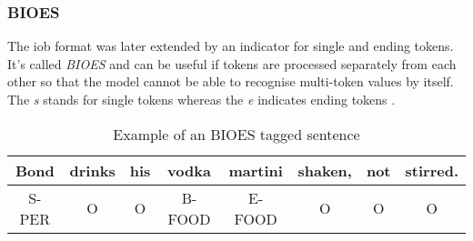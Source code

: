 \subsubsection{BIOES}

The \acrshort{iob} format was later extended by an indicator for single and ending tokens. It's called \emph{BIOES} and can be useful if tokens are processed separately from each other so that the model cannot be able to recognise multi-token values by itself. The \emph{s} stands for single tokens whereas the \emph{e} indicates ending tokens \cite{hofer18}.

\begin{table}[h!]
    \centering
    \begin{tabular}{|c|c|c|c|c|c|c|c|}
        \hline
        Bond & drinks & his & vodka & martini & shaken, & not & stirred. \\
        \hline
        S-PER & O & O & B-FOOD & E-FOOD & O & O & O \\
        \hline
    \end{tabular}
    \caption{Example of an BIOES tagged sentence}
    \label{tbl:bioes-labelling}
\end{table}
